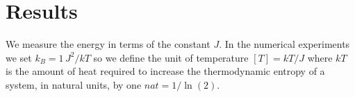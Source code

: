 \documentclass[%
preprint,
 amsmath,amssymb,
 aps,
]{revtex4-1}
\theoremstyle{plain}
\theoremstyle{definition}
\theoremstyle{plain}
\begin{document}
\pagebreak


\section{Results}
We measure the energy in terms of the constant $J$. In the numerical experiments we set $k_B=1 \, J^2/kT$ so we define the unit of temperature $[T]= kT/J$ where $kT$ is the amount of heat required to increase the thermodynamic entropy of a system, in natural units, by one $nat=1/\ln(2)$. 
\end{document}
